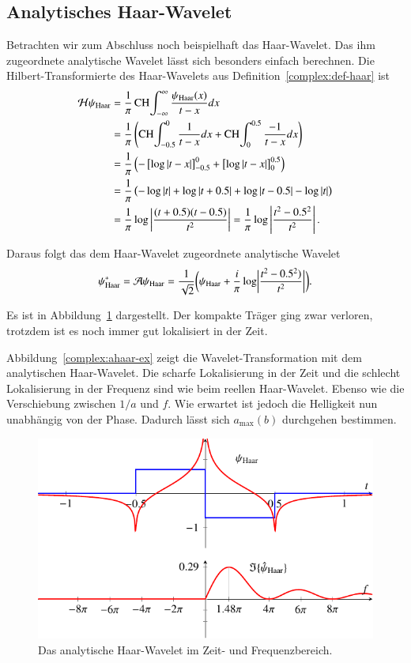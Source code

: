 \subsection{Analytisches Haar-Wavelet}
Betrachten wir zum Abschluss noch beispielhaft das Haar-Wavelet.
Das ihm zugeordnete analytische Wavelet lässt sich besonders einfach berechnen.
Die Hilbert-Transformierte des Haar-Wavelets aus Definition~\ref{complex:def-haar} ist
\begin{align*}
	\Hilb \psi_{\text{Haar}}
	&= \frac{1}{\pi} \CH\int_{-\infty}^{\infty} \frac{\psi_{\text{Haar}}(x)}{t-x} dx\\
	&= \frac{1}{\pi}\left( \CH\int_{-0.5}^{0} \frac{1}{t-x}dx + \CH\int_{0}^{0.5} \frac{-1}{t-x}dx \right)\\
	&= \frac{1}{\pi} \left( -\left[\log \left|t-x\right| \right]_{-0.5}^{0} + \left[\log\left|t-x\right| \right]_{0}^{0.5} \right)\\
	&= \frac{1}{\pi} \left( -\log\left|t\right| + \log\left|t+0.5\right| + \log\left|t-0.5\right| - \log\left|t\right|\right)\\
	&= \frac{1}{\pi} \log\left|\frac{(t+0.5)(t-0.5)}{t^2}\right|
= \frac{1}{\pi} \log\left|\frac{t^2-0.5^2}{t^2}\right|.
\end{align*}

Daraus folgt das dem Haar-Wavelet zugeordnete analytische Wavelet
\[\psi^\ast_{\text{Haar}} = \Ana \psi_{\text{Haar}} =
\frac{1}{\sqrt{2}}\biggl(\psi_{\text{Haar}} 
+ 
\frac{i}{\pi} \log\biggl|\frac{t^2-0.5^2)}{t^2}\biggr|\biggr).\]

Es ist in Abbildung~\ref{complex:ahaar} dargestellt.
Der kompakte Träger ging zwar verloren, trotzdem ist es noch immer gut lokalisiert in der Zeit.

Abbildung~\ref{complex:ahaar-ex} zeigt die Wavelet-Transformation mit dem analytischen Haar-Wavelet.
Die scharfe Lokalisierung in der Zeit und die schlecht Lokalisierung in der Frequenz sind wie beim reellen Haar-Wavelet. Ebenso wie die Verschiebung zwischen $1/a$ und $f$.
Wie erwartet ist jedoch die Helligkeit nun unabhängig von der Phase.
Dadurch lässt sich $a_\text{max}(b)$ durchgehen bestimmen.

\begin{figure}
	\centering
	\includegraphics{papers/complex/images/ahaar.pdf}
	\caption{Das analytische Haar-Wavelet im Zeit- und Frequenzbereich.}
	\label{complex:ahaar}
\end{figure}


